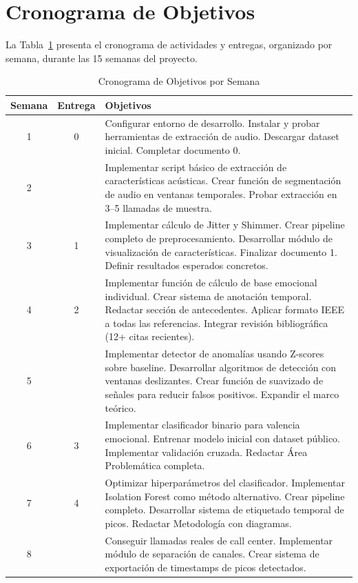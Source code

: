 \section{Cronograma de Objetivos}

La Tabla~\ref{tab:cronograma} presenta el cronograma de actividades y entregas,
organizado por semana, durante las 15 semanas del proyecto.

\begin{table}[!t]
\renewcommand{\arraystretch}{1.3}
\caption{Cronograma de Objetivos por Semana}
\label{tab:cronograma}
\centering
\begin{tabular}{c c p{5cm}}
\toprule
\textbf{Semana} & \textbf{Entrega} & \textbf{Objetivos} \\
\midrule
1  & 0      & Configurar entorno de desarrollo. Instalar y probar herramientas de extracción de audio. Descargar dataset inicial. Completar documento 0. \\
2  &        & Implementar script básico de extracción de características acústicas. Crear función de segmentación de audio en ventanas temporales. Probar extracción en 3--5 llamadas de muestra. \\
3  & 1      & Implementar cálculo de Jitter y Shimmer. Crear pipeline completo de preprocesamiento. Desarrollar módulo de visualización de características. Finalizar documento 1. Definir resultados esperados concretos. \\
4  & 2      & Implementar función de cálculo de base emocional individual. Crear sistema de anotación temporal. Redactar sección de antecedentes. Aplicar formato IEEE a todas las referencias. Integrar revisión bibliográfica (12+ citas recientes). \\
5  &        & Implementar detector de anomalías usando Z-scores sobre baseline. Desarrollar algoritmos de detección con ventanas deslizantes. Crear función de suavizado de señales para reducir falsos positivos. Expandir el marco teórico. \\
6  & 3      & Implementar clasificador binario para valencia emocional. Entrenar modelo inicial con dataset público. Implementar validación cruzada. Redactar Área Problemática completa. \\
7  & 4      & Optimizar hiperparámetros del clasificador. Implementar Isolation Forest como método alternativo. Crear pipeline completo. Desarrollar sistema de etiquetado temporal de picos. Redactar Metodología con diagramas. \\
8  &        & Conseguir llamadas reales de call center. Implementar módulo de separación de canales. Crear sistema de exportación de timestamps de picos detectados. \\

\end{tabular}
\end{table}
